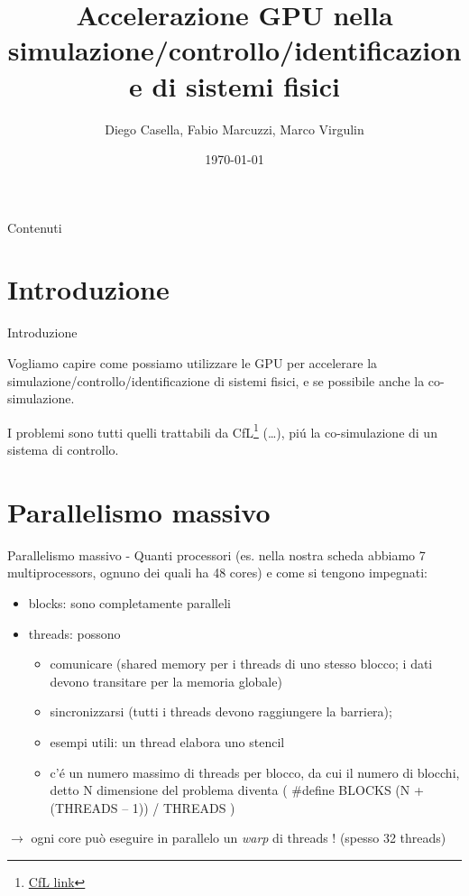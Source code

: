 \documentclass{beamer}
\title{Accelerazione GPU nella simulazione/controllo/identificazione di sistemi fisici}
\author{Diego Casella, Fabio Marcuzzi, Marco Virgulin}
\date{\today}
\begin{document}
\maketitle

\begin{frame}{Contenuti} %
\tableofcontents
\end{frame}

\section{Introduzione}
\begin{frame}{Introduzione}

Vogliamo capire come possiamo utilizzare le GPU per accelerare la simulazione/controllo/identificazione di sistemi fisici, e se possibile anche
la co-simulazione.

I problemi sono tutti quelli trattabili da CfL\footnote{ \href{http://www.simnumerica.com/content/what-cfl}{CfL link}} (\dots), pi\'u la co-simulazione di un sistema di controllo.

\end{frame}

\section{Parallelismo massivo}
\begin{frame}{Parallelismo massivo}
- Quanti processori (es. nella nostra scheda abbiamo 7 multiprocessors, ognuno dei quali ha 48 cores) e come si tengono impegnati: 
\begin{itemize}
\item blocks: sono completamente paralleli 
\item threads: possono 
	\begin{itemize}
	\item comunicare (shared memory per i threads di uno stesso blocco; i dati devono transitare per la memoria globale)
	\item sincronizzarsi (tutti i threads devono raggiungere la barriera); 
	\item esempi utili: un thread elabora uno stencil
	\item c'\'e un numero massimo di threads per blocco, da cui il numero di blocchi, detto N dimensione del problema diventa ( \#define BLOCKS (N + (THREADS – 1)) / THREADS )
	\end{itemize}
\end{itemize}

$\rightarrow$ ogni core può eseguire in parallelo un \textit{warp} di threads ! (spesso 32 threads)
\end{frame}
\end{document}
